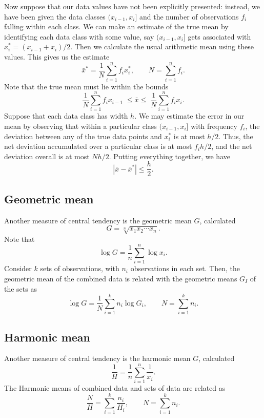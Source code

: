 \documentclass[11pt]{article}
\theoremstyle{definition}
\theoremstyle{remark}
\numberwithin{equation}{section}
\begin{document}
    Now suppose that our data values have not been explicitly presented: instead, we
    have been given the data classes $(x_{i - 1}, x_{i}]$ and the number of
    observations $f_i$ falling within each class. We can make an estimate of the true
    mean by identifying each data class with some value, say $(x_{i - 1}, x_{i}]$ gets
    associated with $x_i^* = (x_{i - 1} + x_{i}) / 2$. Then we calculate the usual
    arithmetic mean using these values. This gives us the estimate \[
        \bar{x}^* = \frac{1}{N}\sum_{i = 1}^n f_i x_i^*, \qquad 
        N = \sum_{i = 1}^n f_i.
    \] Note that the true mean must lie within the bounds \[
        \frac{1}{N}\sum_{i = 1}^{n} f_i x_{i - 1} \;\leq \bar{x} \leq\;
        \frac{1}{N}\sum_{i = 1}^{n} f_i x_{i}.
    \] Suppose that each data class has width $h$. We may estimate the error in our
    mean by observing that within a particular class $(x_{i - 1}, x_i]$ with
    frequency $f_i$, the deviation between any of the true data points and $x_i^*$ is
    at most $h / 2$. Thus, the net deviation accumulated over a particular class is
    at most $f_ih / 2$, and the net deviation overall is at most $Nh / 2$. Putting
    everything together, we have \[
        |\bar{x} - \bar{x}^*| \leq \frac{h}{2}.
    \]

    
    \subsection{Geometric mean}

    Another measure of central tendency is the geometric mean $G$, calculated \[
        G = \sqrt[n]{x_1x_2\cdots x_n}.
    \] Note that \[
        \log{G} = \frac{1}{n}\sum_{i = 1}^n \log{x_i}.
    \] Consider $k$ sets of observations, with $n_i$ observations in each set. Then,
    the geometric mean of the combined data is related with the geometric means $G_I$
    of the sets as \[
        \log{G} = \frac{1}{N}\sum_{i = 1}^k n_i\log{G_i}, \qquad N = \sum_{i = 1}^k
        n_i.
    \]
    
    \subsection{Harmonic mean}

    Another measure of central tendency is the harmonic mean $G$, calculated \[
        \frac{1}{H} = \frac{1}{n}\sum_{i = 1}^n \frac{1}{x_i}.
    \] The Harmonic means of combined data and sets of data are related as \[
        \frac{N}{H} = \sum_{i = 1}^k \frac{n_i}{H_i}, \qquad N = \sum_{i = 1}^k n_i.
    \] 
\end{document}
